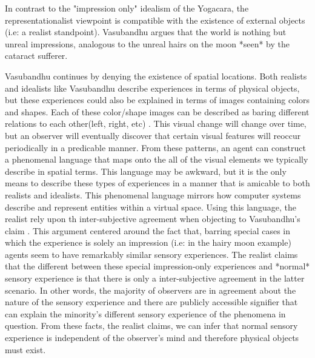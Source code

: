  In contrast to the "impression only" idealism of the Yogacara, the representationalist viewpoint is compatible with the existence of external objects (i.e: a realist standpoint). Vasubandhu argues that the world is nothing but unreal impressions, analogous to the unreal hairs on the moon *seen* by the cataract sufferer.

Vasubandhu continues by denying the existence of spatial locations. Both realists and idealists like Vasubandhu describe experiences in terms of physical objects, but these experiences could also be explained in terms of images containing colors and shapes. Each of these color/shape images can be described as baring different relations to each other(left, right, etc) \cite{siderits2007buddhism}. This visual change will change over time, but an observer will eventually discover that certain visual features will reoccur periodically in a predicable manner. From these patterns, an agent can construct a phenomenal language that maps onto the all of the visual elements we typically describe in spatial terms. This language may be awkward, but it is the only means to describe these types of experiences in a manner that is amicable to both realists and idealists. This phenomenal language mirrors how computer systems describe and represent entities within a virtual space.
 Using this language, the realist rely upon th inter-subjective agreement when objecting to Vasubandhu's claim \cite{siderits2007buddhism}. This argument centered around the fact that, barring special cases in which the experience is solely an impression (i.e: in the hairy moon example) agents seem to have remarkably similar sensory experiences. The realist claims that the different between these special impression-only experiences and *normal* sensory experience is that there is only a inter-subjective agreement in the latter scenario. In other words, the majority of observers are in agreement about the nature of the sensory experience and there are publicly accessible signifier that can explain the minority's different sensory experience of the phenomena in question. From these facts, the realist claims, we can infer that normal sensory experience is independent of the observer's mind and therefore physical objects must exist.

